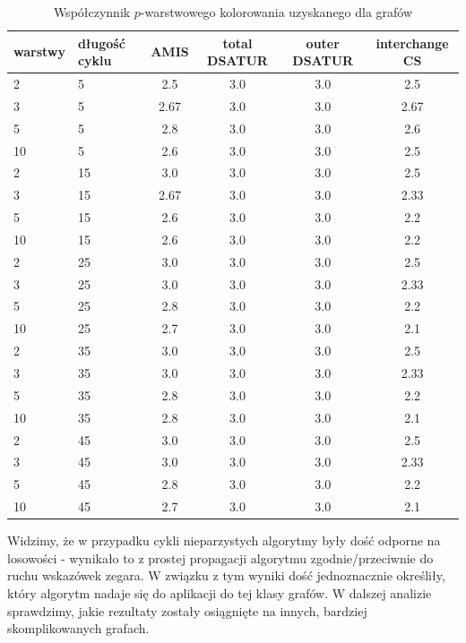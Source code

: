 \documentclass[10pt,a4paper]{article}
\begin{document}
	\begin{table}[H]
		\centering
		\begin{tabular}{|l|l|c|c|c|c|}
			\hline
			\textbf{warstwy} & \textbf{długość cyklu} & \textbf{AMIS} & \textbf{total DSATUR} & \textbf{outer DSATUR} & \textbf{interchange CS} \\		
			\hline
			2 & 5 & 2.5 & 3.0 & 3.0 & 2.5 \\ 
			3 & 5 & 2.67 & 3.0 & 3.0 & 2.67 \\ 
			5 & 5 & 2.8 & 3.0 & 3.0 & 2.6 \\ 
			10 & 5 & 2.6 & 3.0 & 3.0 & 2.5 \\ 
			\hline
			2 & 15 & 3.0 & 3.0 & 3.0 & 2.5 \\ 
			3 & 15 & 2.67 & 3.0 & 3.0 & 2.33 \\ 
			5 & 15 & 2.6 & 3.0 & 3.0 & 2.2 \\ 
			10 & 15 & 2.6 & 3.0 & 3.0 & 2.2 \\ 
			\hline
			2 & 25 & 3.0 & 3.0 & 3.0 & 2.5 \\ 
			3 & 25 & 3.0 & 3.0 & 3.0 & 2.33 \\ 
			5 & 25 & 2.8 & 3.0 & 3.0 & 2.2 \\ 
			10 & 25 & 2.7 & 3.0 & 3.0 & 2.1 \\ 
			\hline
			2 & 35 & 3.0 & 3.0 & 3.0 & 2.5 \\ 
			3 & 35 & 3.0 & 3.0 & 3.0 & 2.33 \\ 
			5 & 35 & 2.8 & 3.0 & 3.0 & 2.2 \\ 
			10 & 35 & 2.8 & 3.0 & 3.0 & 2.1 \\ 
			\hline
			2 & 45 & 3.0 & 3.0 & 3.0 & 2.5 \\ 
			3 & 45 & 3.0 & 3.0 & 3.0 & 2.33 \\ 
			5 & 45 & 2.8 & 3.0 & 3.0 & 2.2 \\ 
			10 & 45 & 2.7 & 3.0 & 3.0 & 2.1 \\
			\hline
		\end{tabular}
		\caption{Współczynnik $p$-warstwowego kolorowania uzyskanego dla grafów }
	\end{table}

	
	Widzimy, że w przypadku cykli nieparzystych algorytmy były dość odporne na losowości - wynikało to z prostej propagacji algorytmu zgodnie/przeciwnie do ruchu wskazówek zegara. W związku z tym wyniki dość jednoznacznie określiły, który algorytm nadaje się do aplikacji do tej klasy grafów. W dalszej analizie sprawdzimy, jakie rezultaty zostały osiągnięte na innych, bardziej skomplikowanych grafach.
	
\end{document}
